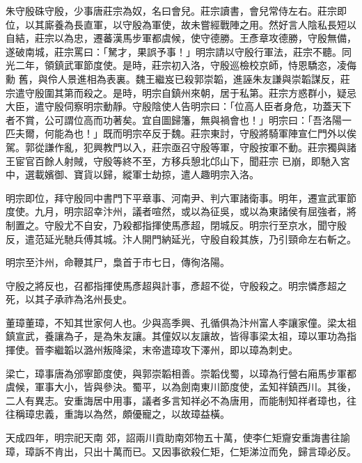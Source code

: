 
\begin{pinyinscope}

 朱守殷硃守殷，少事唐莊宗為奴，名曰會兒。莊宗讀書，會兒常侍左右。莊宗即位，以其廝養為長直軍，以守殷為軍使，故未嘗經戰陣之用。然好言人陰私長短以自結，莊宗以為忠，遷蕃漢馬步軍都虞候，使守德勝。王彥章攻德勝，守殷無備，遂破南城，莊宗罵曰：「駑才，果誤予事！」明宗請以守殷行軍法，莊宗不聽。同光二年，領鎮武軍節度使。是時，莊宗初入洛，守殷巡檢校京師，恃恩驕恣，凌侮勳
 舊，與伶人景進相為表裏。魏王繼岌已殺郭崇韜，進誣朱友謙與崇韜謀反，莊宗遣守殷圍其第而殺之。是時，明宗自鎮州來朝，居于私第。莊宗方惑群小，疑忌大臣，遣守殷伺察明宗動靜。守殷陰使人告明宗曰：「位高人臣者身危，功蓋天下者不賞，公可謂位高而功著矣。宜自圖歸籓，無與禍會也！」明宗曰：「吾洛陽一匹夫爾，何能為也！」既而明宗卒反于魏。莊宗東討，守殷將騎軍陣宣仁門外以俟駕。郭從謙作亂，犯興教門以入，莊宗亟召守殷等軍，守殷按軍不動。莊宗獨與諸王宦官百餘人射賊，守殷等終不至，方移兵憩北邙山下，聞莊宗
 已崩，即馳入宮中，選載嬪御、寶貨以歸，縱軍士劫掠，遣人趣明宗入洛。



 明宗即位，拜守殷同中書門下平章事、河南尹、判六軍諸衛事。明年，遷宣武軍節度使。九月，明宗詔幸汴州，議者喧然，或以為征吳，或以為東諸侯有屈強者，將制置之。守殷尤不自安，乃殺都指揮使馬彥超，閉城反。明宗行至京水，聞守殷反，遣范延光馳兵傅其城。汴人開門納延光，守殷自殺其族，乃引頸命左右斬之。



 明宗至汴州，命鞭其尸，梟首于市七日，傳徇洛陽。



 守殷之將反也，召都指揮使馬彥超與計事，彥超不從，守殷殺之。明宗憐彥超之死，以其子承祚為洺州長史。



 董璋董璋，不知其世家何人也。少與高季興、孔循俱為汴州富人李讓家僮。梁太祖鎮宣武，養讓為子，是為朱友讓。其僮奴以友讓故，皆得事梁太祖，璋以軍功為指揮使。晉李繼韜以潞州叛降梁，末帝遣璋攻下澤州，即以璋為刺史。



 梁亡，璋事唐為邠寧節度使，與郭崇韜相善。崇韜伐蜀，以璋為行營右廂馬步軍都虞候，軍事大小，皆與參決。蜀平，以為劍南東川節度使，孟知祥鎮西川。其後，二人有異志。安重誨居中用事，議者多言知祥必不為唐用，而能制知祥者璋也，往往稱璋忠義，重誨以為然，頗優寵之，以故璋益橫。



 天成四年，明宗祀天南
 郊，詔兩川貢助南郊物五十萬，使李仁矩齎安重誨書往諭璋，璋訴不肯出，只出十萬而已。又因事欲殺仁矩，仁矩涕泣而免，歸言璋必反。




\end{pinyinscope}
